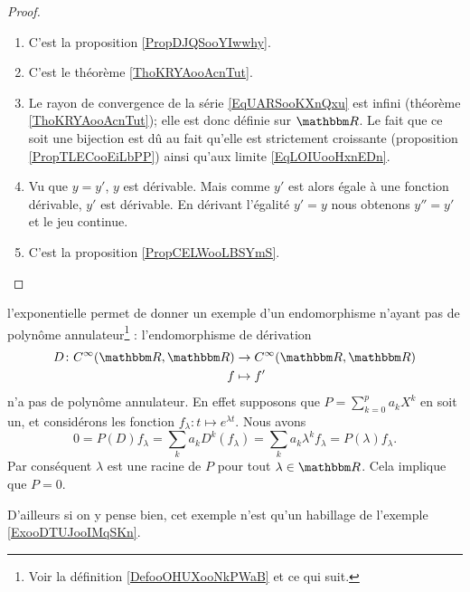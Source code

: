 \begin{proof}
    \begin{enumerate}
        \item
            C'est la proposition \ref{PropDJQSooYIwwhy}.
        \item 
            C'est le théorème \ref{ThoKRYAooAcnTut}.
        \item
            Le rayon de convergence de la série \eqref{EqUARSooKXnQxu} est infini (théorème \ref{ThoKRYAooAcnTut}); elle est donc définie sur \( \eR\). Le fait que ce soit une bijection est dû au fait qu'elle est strictement croissante (proposition \ref{PropTLECooEiLbPP}) ainsi qu'aux limite \eqref{EqLOIUooHxnEDn}.
        \item
            Vu que \( y=y'\), \( y\) est dérivable. Mais comme \( y'\) est alors égale à une fonction dérivable, \( y'\) est dérivable. En dérivant l'égalité \( y'=y\) nous obtenons \( y''=y'\) et le jeu continue.
        \item
            C'est la proposition \ref{PropCELWooLBSYmS}.
    \end{enumerate}
\end{proof}

\begin{example}     \label{ExooLRHCooMYLQTU}
    l'exponentielle permet de donner un exemple d'un endomorphisme n'ayant pas de polynôme annulateur\footnote{Voir la définition \ref{DefooOHUXooNkPWaB} et ce qui suit.} : l'endomorphisme de dérivation
    \begin{equation}
        \begin{aligned}
            D\colon C^{\infty}(\eR,\eR)&\to  C^{\infty}(\eR,\eR) \\
            f&\mapsto f' 
        \end{aligned}
    \end{equation}
    n'a pas de polynôme annulateur. En effet supposons que \( P=\sum_{k=0}^{p}a_kX^k\) en soit un, et considérons les fonction \( f_{\lambda}\colon t\mapsto  e^{\lambda t}\). Nous avons
    \begin{equation}
            0=P(D)f_{\lambda}
            =\sum_ka_kD^k(f_{\lambda})
            =\sum_ka_k\lambda^kf_{\lambda}
            =P(\lambda)f_{\lambda}.
    \end{equation}
    Par conséquent \( \lambda\) est une racine de \( P\) pour tout \( \lambda\in \eR\). Cela implique que \( P=0\).
    
    D'ailleurs si on y pense bien, cet exemple n'est qu'un habillage de l'exemple \ref{ExooDTUJooIMqSKn}.
\end{example}

